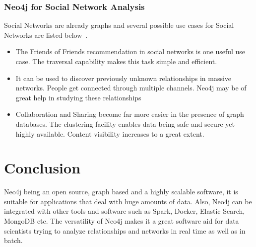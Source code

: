 \documentclass[9pt,twocolumn,twoside]{../../styles/osajnl}
\begin{document}
\subsubsection{Neo4j for Social Network Analysis}
Social Networks are already graphs and several possible use cases for Social Networks are listed below~\cite{www-neo4j-uc2}.
\begin{itemize}
    \item The Friends of Friends recommendation in social networks is one useful use case. The traversal capability makes this task simple and efficient. 
    \item It can be used to discover previously unknown relationships in massive networks. People get connected through multiple channels. Neo4j may be of great help in studying these relationships 
    \item Collaboration and Sharing become far more easier in the presence of graph databases. The clustering facility enables data being safe and secure yet highly available. Content visibility increases to a great extent. 
\end{itemize}


\section{Conclusion}
Neo4j being an open source, graph based and a highly scalable software, it is suitable for applications that deal with huge amounts of data.  Also, Neo4j can be integrated with other tools and software such as Spark, Docker, Elastic Search, MongoDB etc.  The versatility of Neo4j makes it a great software aid for data scientists trying to analyze relationships and networks in real time as well as in batch. 




 
\end{document}
